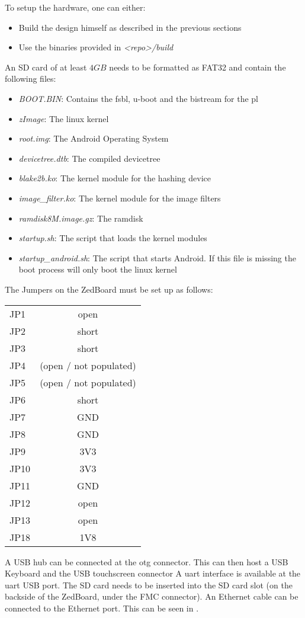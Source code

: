 To setup the hardware, one can either:
\begin{itemize}
	\item Build the design himself as described in the previous sections
	\item Use the binaries provided in \emph{<repo>/build}
\end{itemize}
An SD card of at least $4GB$ needs to be formatted as FAT32 and contain the
following files:
\begin{itemize}
	\item \emph{BOOT.BIN}: Contains the \gls{fsbl}, u-boot and the bistream
		for the \gls{pl}
	\item \emph{zImage}: The linux kernel
	\item \emph{root.img}: The Android Operating System
	\item \emph{devicetree.dtb}: The compiled devicetree
	\item \emph{blake2b.ko}: The kernel module for the hashing device
	\item \emph{image\_filter.ko}: The kernel module for the image filters
	\item \emph{ramdisk8M.image.gz}: The ramdisk
	\item \emph{startup.sh}: The script that loads the kernel modules
	\item \emph{startup\_android.sh}: The script that starts Android. If this
		file is missing the boot process will only boot the linux kernel
\end{itemize}
The Jumpers on the ZedBoard must be set up as follows:

\begin{center}
	\begin{tabular}{lc}
		JP1 & open\\
		JP2 & short\\
		JP3 & short\\
		JP4 & (open / not populated)\\
		JP5 & (open / not populated)\\
		JP6 & short\\
		JP7 & GND\\
		JP8 & GND\\
		JP9 & 3V3\\
		JP10 & 3V3\\
		JP11 & GND\\
		JP12 & open\\
		JP13 & open\\
		JP18 & 1V8\\
	\end{tabular}
\end{center}
A USB hub can be connected at the \gls{otg} connector.
This can then host a USB Keyboard and the USB touchscreen connector
A \gls{uart} interface is available at the \gls{uart} USB port.
The SD card needs to be inserted into the SD card slot (on the backside of
the ZedBoard, under the FMC connector).
An Ethernet cable can be connected to the Ethernet port.
This can be seen in .

